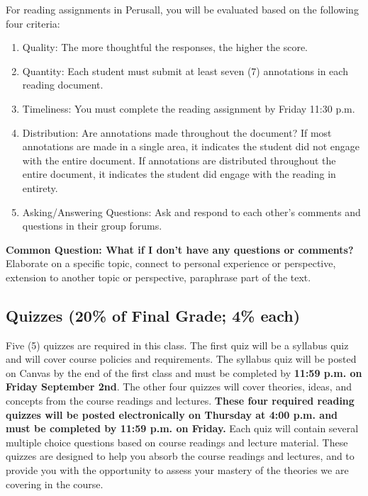 \documentclass[11pt,]{article}
\providecommand{\tightlist}{%
  \setlength{\itemsep}{0pt}\setlength{\parskip}{0pt}}
\begin{document}
For reading assignments in Perusall, you will be evaluated based on the
following four criteria:

\begin{enumerate}
\def\labelenumi{\arabic{enumi}.}
\tightlist
\item
  Quality: The more thoughtful the responses, the higher the score.
\item
  Quantity: Each student must submit at least seven (7) annotations in
  each reading document.
\item
  Timeliness: You must complete the reading assignment by Friday 11:30
  p.m.
\item
  Distribution: Are annotations made throughout the document? If most
  annotations are made in a single area, it indicates the student did
  not engage with the entire document. If annotations are distributed
  throughout the entire document, it indicates the student did engage
  with the reading in entirety.
\item
  Asking/Answering Questions: Ask and respond to each other's comments
  and questions in their group forums.
\end{enumerate}

\textbf{Common Question: What if I don't have any questions or
comments?} Elaborate on a specific topic, connect to personal experience
or perspective, extension to another topic or perspective, paraphrase
part of the text.

\hypertarget{quizzes}{%
\subsection{Quizzes (20\% of Final Grade; 4\% each)}\label{quizzes}}

Five (5) quizzes are required in this class. The first quiz will be a
syllabus quiz and will cover course policies and requirements. The
syllabus quiz will be posted on Canvas by the end of the first class and
must be completed by \textbf{11:59 p.m. on Friday September 2nd}. The
other four quizzes will cover theories, ideas, and concepts from the
course readings and lectures. \textbf{These four required reading
quizzes will be posted electronically on Thursday at 4:00 p.m. and must
be completed by 11:59 p.m. on Friday.} Each quiz will contain several
multiple choice questions based on course readings and lecture material.
These quizzes are designed to help you absorb the course readings and
lectures, and to provide you with the opportunity to assess your mastery
of the theories we are covering in the course.
\end{document}
